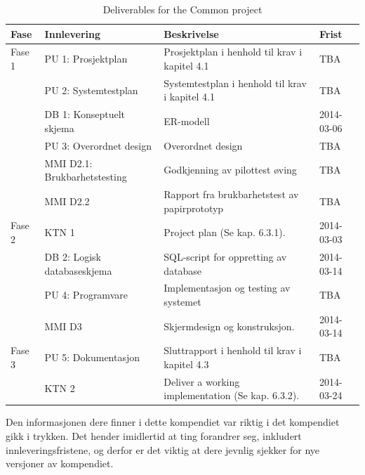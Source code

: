 \documentclass[a4paper]{scrartcl}
\begin{document}
\begin{table}[h]
\begin{tabularx}{\textwidth}{ l X X l }

\hline
\hline
Fase & Innlevering & Beskrivelse & Frist \\
\hline

Fase 1
&
PU 1: Prosjektplan &
Prosjektplan i henhold til krav i kapitel 4.1 &
TBA \\

&
PU 2: Systemtestplan &
Systemtestplan i henhold til krav i kapitel 4.1 &
TBA \\

&
DB 1: Konseptuelt skjema &
ER-modell &
2014-03-06 \\

&
PU 3: Overordnet design &
Overordnet design &
TBA \\

&
MMI D2.1: Brukbarhetstesting &
Godkjenning av pilottest øving &
TBA \\

&
MMI D2.2 &
Rapport fra brukbarhetstest av papirprototyp &
TBA \\

Fase 2
&
KTN 1 &
Project plan (Se kap. 6.3.1). &
2014-03-03 \\

&
DB 2: Logisk databaseskjema &
SQL-script for oppretting av database &
2014-03-14 \\

&
PU 4: Programvare &
Implementasjon og testing av systemet &
TBA \\

&
MMI D3 &
Skjermdesign og konstruksjon. &
2014-03-14 \\

Fase 3
&
PU 5: Dokumentasjon &
Sluttrapport i henhold til krav i kapitel 4.3 &
TBA \\

&
KTN 2 &
Deliver a working implementation (Se kap. 6.3.2). &
2014-03-24 \\

\hline

\end{tabularx}
\caption{Deliverables for the Common project}
\end{table}

Den informasjonen dere finner i dette kompendiet var riktig i det kompendiet gikk i trykken. Det hender imidlertid at ting forandrer seg, inkludert innleveringsfristene, og derfor er det viktig at dere jevnlig sjekker for nye versjoner av kompendiet.
\end{document}

